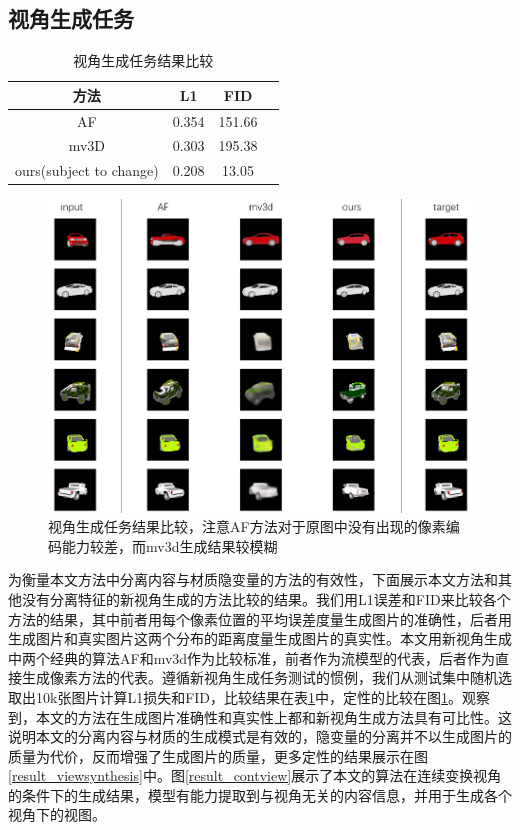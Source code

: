\documentclass[UTF8,openany,AutoFakeBold,AutoFakeSlant,cs4size]{ctexbook}
\begin{document}
\subsection{视角生成任务}

\begin{table}[h]
\small %
\centering
\caption{视角生成任务结果比较}
\label{novel_view_thesis}
\begin{tabular}{cccc} %
\toprule %
方法 & L1 & FID \\
\midrule
AF\cite{Zhou2016ViewSB} & 0.354 & 151.66 \\
mv3D\cite{Su2015MultiviewCN} & 0.303 & 195.38 \\
ours(subject to change) & 0.208 & 13.05 \\
\bottomrule
\end{tabular}
\end{table}

\begin{figure}
\centering
\includegraphics[width=\linewidth]{./images/compare_methods.png}
\caption{视角生成任务结果比较，注意AF方法对于原图中没有出现的像素编码能力较差，而mv3d生成结果较模糊}
\label{compare_methods}
\end{figure}

为衡量本文方法中分离内容与材质隐变量的方法的有效性，下面展示本文方法和其他没有分离特征的新视角生成的方法比较的结果。我们用L1误差和FID来比较各个方法的结果，其中前者用每个像素位置的平均误差度量生成图片的准确性，后者用生成图片和真实图片这两个分布的距离度量生成图片的真实性。本文用新视角生成中两个经典的算法AF\cite{Zhou2016ViewSB}和mv3d\cite{TDB16a}作为比较标准，前者作为流模型的代表，后者作为直接生成像素方法的代表。遵循新视角生成任务测试的惯例，我们从测试集中随机选取出10k张图片计算L1损失和FID，比较结果在表\ref{novel_view_thesis}中，定性的比较在图\ref{compare_methods}。观察到，本文的方法在生成图片准确性和真实性上都和新视角生成方法具有可比性。这说明本文的分离内容与材质的生成模式是有效的，隐变量的分离并不以生成图片的质量为代价，反而增强了生成图片的质量，更多定性的结果展示在图\ref{result_viewsynthesis}中。图\ref{result_contview}展示了本文的算法在连续变换视角的条件下的生成结果，模型有能力提取到与视角无关的内容信息，并用于生成各个视角下的视图。
\end{document}
